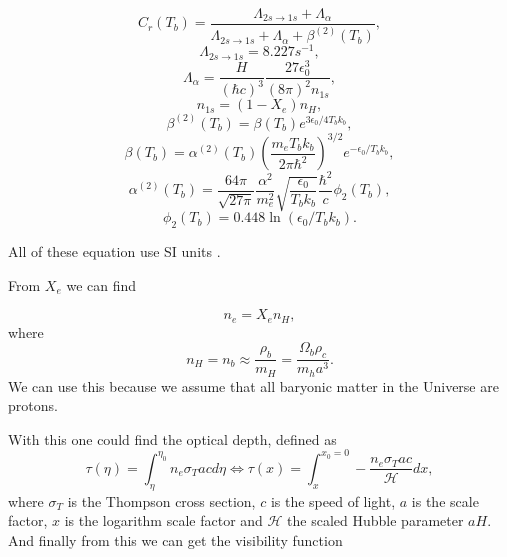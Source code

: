 \documentclass[a4paper,norsk, 10pt]{article}
\begin{document}
\begin{equation}
C_r (T_b) = \frac{\Lambda_{2s \rightarrow 1s}+ \Lambda_{\alpha}}{\Lambda_{2s \rightarrow 1s} + \Lambda_{\alpha} + \beta^{(2)}(T_b)},
\end{equation}
\begin{equation}
\Lambda_{2s\rightarrow 1s} = 8.227 s^{-1},
\end{equation}
\begin{equation}
\Lambda_{\alpha} = \frac{H}{(\hbar c)^3}\frac{27\epsilon_0^3}{(8\pi)^2 n_{1s}},
\end{equation}
\begin{equation}
n_{1s} = (1-X_e)n_{H},
\end{equation}
\begin{equation}\label{eq:beta2}
\beta^{(2)}(T_b) = \beta(T_b)e^{3\epsilon_0/4T_bk_b},
\end{equation}
\begin{equation}\label{eq:beta}
\beta(T_b) = \alpha^{(2)}(T_b)\left(\frac{m_eT_b k_b}{2\pi \hbar^2}\right)^{3/2}e^{-\epsilon_0/T_bk_b},
\end{equation}
\begin{equation}
\alpha^{(2)}(T_b) = \frac{64\pi}{\sqrt{27\pi}}\frac{\alpha^2}{m_e^2}\sqrt{\frac{\epsilon_0}{T_bk_b}}\frac{\hbar^2}{c}\phi_{2}(T_b),
\end{equation}
\begin{equation}
\phi_{2}(T_b) = 0.448\ln(\epsilon_0/T_bk_b).
\end{equation}

All of these equation use SI units . 

From $X_e$ we can find

\begin{equation}\label{eq:n_e}
n_e = X_e n_H,
\end{equation}
where
\begin{equation}
n_H = n_b \approx \frac{\rho_b}{m_H} = \frac{\Omega_b \rho_c}{m_h a^3}.
\end{equation}
We can use this because we assume that all baryonic matter in the Universe are protons.

With this one could find the optical depth, defined as 
\begin{equation}\label{eq:tau}
\tau(\eta) = \int_{\eta}^{\eta_0} n_e \sigma_T a c d\eta \Leftrightarrow \tau(x) = \int_x^{x_0 = 0} - \frac{n_e \sigma_T a c}{\mathcal{H}} dx,
\end{equation}
where $\sigma_T$ is the Thompson cross section, $c$ is the speed of light, $a$ is the scale factor, $x$ is the logarithm scale factor and $\mathcal{H}$ the scaled Hubble parameter $aH$. And finally from this we can get the visibility function
\end{document}
